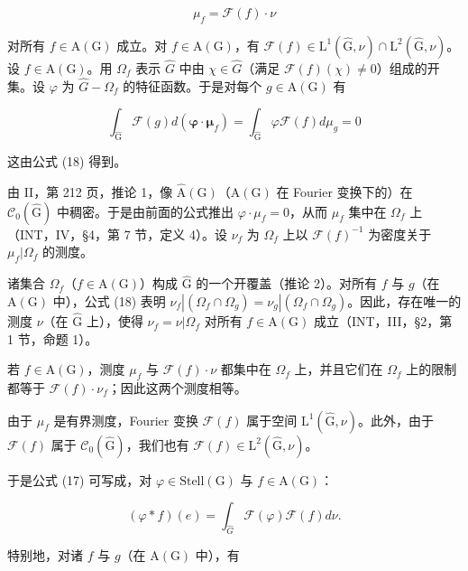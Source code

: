 \[
\mu_ {f} = \mathcal {F} (f) \cdot \nu
\]

对所有 \(f \in \mathrm{A}(\mathrm{G})\) 成立。对 \(f \in \mathrm{A}(\mathrm{G})\)，有 \(\mathcal{F}(f) \in \mathrm{L}^{1}(\widehat{\mathrm{G}}, \nu) \cap \mathrm{L}^{2}(\widehat{\mathrm{G}}, \nu)\)。设 \(f \in \mathrm{A}(\mathrm{G})\)。用 \(\Omega_{f}\) 表示 \(\widehat{G}\) 中由 \(\chi \in \widehat{G}\)（满足 \(\mathcal{F}(f)(\chi) \neq 0\)）组成的开集。设 \(\varphi\) 为 \(\widehat{G} - \Omega_{f}\) 的特征函数。于是对每个 \(g \in \mathrm{A}(\mathrm{G})\) 有

\[
\int_ {\widehat {\mathrm{G}}} \mathcal {F} (g) d (\boldsymbol {\varphi} \cdot \boldsymbol {\mu} _ {f}) = \int_ {\widehat {\mathrm{G}}} \varphi \mathcal {F} (f) d \mu_ {g} = 0
\]

这由公式 (18) 得到。

由 II，第 212 页，推论 1，像 \(\widehat{\mathrm{A}}(\mathrm{G})\)（\(\mathrm{A}(\mathrm{G})\) 在 Fourier 变换下的）在 \(\mathcal{C}_0(\widehat{\mathrm{G}})\) 中稠密。于是由前面的公式推出 \(\varphi \cdot \mu_f = 0\)，从而 \(\mu_f\) 集中在 \(\Omega_f\) 上（INT，IV，§4，第 7 节，定义 4）。设 \(\nu_f\) 为 \(\Omega_f\) 上以 \(\mathcal{F}(f)^{-1}\) 为密度关于 \(\mu_f|\Omega_f\) 的测度。

诸集合 \(\Omega_f\)（\(f \in \mathrm{A}(\mathrm{G})\)）构成 \(\widehat{\mathrm{G}}\) 的一个开覆盖（推论 2）。对所有 \(f\) 与 \(g\)（在 \(\mathrm{A}(\mathrm{G})\) 中），公式 (18) 表明 \(\nu_f|(\Omega_f \cap \Omega_g) = \nu_g|(\Omega_f \cap \Omega_g)\)。因此，存在唯一的测度 \(\nu\)（在 \(\widehat{\mathrm{G}}\) 上），使得 \(\nu_f = \nu|\Omega_f\) 对所有 \(f \in \mathrm{A}(\mathrm{G})\) 成立（INT，III，§2，第 1 节，命题 1）。

若 \(f \in \mathrm{A}(\mathrm{G})\)，测度 \(\mu_f\) 与 \(\mathcal{F}(f) \cdot \nu\) 都集中在 \(\Omega_f\) 上，并且它们在 \(\Omega_f\) 上的限制都等于 \(\mathcal{F}(f) \cdot \nu_f\)；因此这两个测度相等。

由于 \(\mu_f\) 是有界测度，Fourier 变换 \(\mathcal{F}(f)\) 属于空间 \(\mathrm{L}^1 (\widehat{\mathrm{G}},\nu)\)。此外，由于 \(\mathcal{F}(f)\) 属于 \(\mathcal{C}_0(\widehat{\mathrm{G}})\)，我们也有 \(\mathcal{F}(f)\in \mathrm{L}^2 (\widehat{\mathrm{G}},\nu)\)。

于是公式 (17) 可写成，对 \(\varphi\in\mathrm{Stell}(\mathrm{G})\) 与 \(f\in\mathrm{A}(\mathrm{G})\)：

\[
(\varphi * f) (e) = \int_ {\widehat {G}} \mathcal {F} (\varphi) \mathcal {F} (f) d \nu .\tag{20}
\]

特别地，对诸 \(f\) 与 \(g\)（在 \(\mathrm{A}(\mathrm{G})\) 中），有

